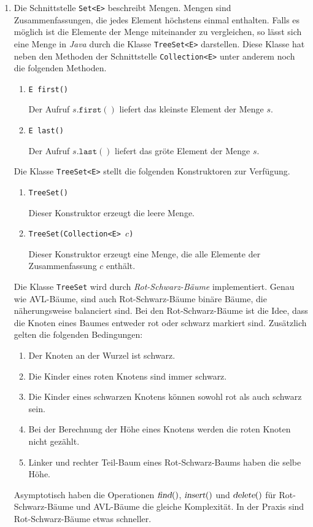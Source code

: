 \begin{enumerate}
\item Die Schnittstelle \texttt{Set<E>} beschreibt Mengen.  Mengen sind Zusammenfassungen, die
      jedes Element h\"ochstens einmal enthalten.  Falls es m\"oglich ist die Elemente
      der Menge miteinander zu vergleichen, so l\"asst sich eine Menge in \textsl{Java}
      durch die Klasse \texttt{TreeSet<E>} darstellen.  Diese Klasse hat neben den Methoden
      der Schnittstelle \texttt{Collection<E>} unter anderem noch die folgenden Methoden.
      \begin{enumerate}
      \item \texttt{E first()}

            Der Aufruf $s.\mathtt{first}()$ liefert das kleinste Element der Menge $s$.
      \item \texttt{E last()}

            Der Aufruf $s.\mathtt{last}()$ liefert das gr\"o\3te Element der Menge $s$.
      \end{enumerate}
      Die Klasse \texttt{TreeSet<E>} stellt die folgenden Konstruktoren zur Verf\"ugung.
      \begin{enumerate}
      \item \texttt{TreeSet()}

            Dieser Konstruktor erzeugt die leere Menge.
      \item \texttt{TreeSet(Collection<E> $c$)}
        
            Dieser Konstruktor erzeugt eine Menge, die alle Elemente der Zusammenfassung
            $c$ enth\"alt.
      \end{enumerate}
      Die Klasse \texttt{TreeSet} wird durch \emph{Rot-Schwarz-B\"aume} implementiert.
      Genau wie AVL-B\"aume, sind auch Rot-Schwarz-B\"aume bin\"are B\"aume, die n\"aherungsweise
      balanciert sind.  Bei den Rot-Schwarz-B\"aume ist die Idee, dass die Knoten
      eines Baumes entweder rot oder schwarz markiert sind.  Zus\"atzlich gelten die
      folgenden Bedingungen:
      \begin{enumerate}
      \item Der Knoten an der Wurzel ist schwarz.
      \item Die Kinder eines roten Knotens sind immer schwarz. 
      \item Die Kinder eines schwarzen Knotens k\"onnen sowohl rot als auch schwarz sein.  
      \item Bei der Berechnung der H\"ohe eines Knotens werden die roten
            Knoten nicht gez\"ahlt.
      \item Linker und rechter Teil-Baum eines Rot-Schwarz-Baums haben die 
            selbe H\"ohe.
      \end{enumerate}
      Asymptotisch haben die Operationen $\textsl{find}()$, $\textsl{insert}()$ und
      $\textsl{delete}()$ f\"ur Rot-Schwarz-B\"aume und AVL-B\"aume die gleiche Komplexit\"at.
      In der Praxis sind Rot-Schwarz-B\"aume etwas schneller.


\end{enumerate}
